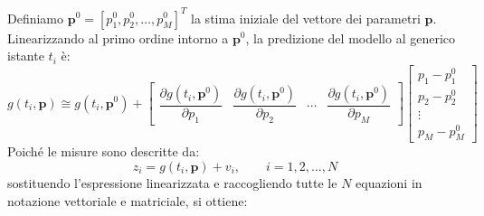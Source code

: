 Definiamo $\mathbf{p}^{0} = [p_{1}^{0}, p_{2}^{0}, \dots, p_{M}^{0}]^{T}$ la stima iniziale del vettore dei parametri $\mathbf{p}$. Linearizzando al primo ordine intorno a $\mathbf{p}^{0}$, la predizione del modello al generico istante $t_{i}$ è:
\begin{equation}
g(t_{i}, \mathbf{p}) \cong g(t_{i}, \mathbf{p}^{0}) +
\begin{bmatrix}
\dfrac{\partial g(t_{i}, \mathbf{p}^{0})}{\partial p_{1}} & \dfrac{\partial g(t_{i}, \mathbf{p}^{0})}{\partial p_{2}} & \cdots & \dfrac{\partial g(t_{i}, \mathbf{p}^{0})}{\partial p_{M}}
\end{bmatrix}
\begin{bmatrix}
p_{1} - p_{1}^{0} \\
p_{2} - p_{2}^{0} \\
\vdots \\
p_{M} - p_{M}^{0}
\end{bmatrix}
\end{equation}
Poiché le misure sono descritte da:
\begin{equation}
z_{i} = g(t_{i}, \mathbf{p}) + v_{i}, \qquad i = 1, 2, \dots, N
\end{equation}
sostituendo l'espressione linearizzata e raccogliendo tutte le $N$ equazioni in notazione vettoriale e matriciale, si ottiene:
